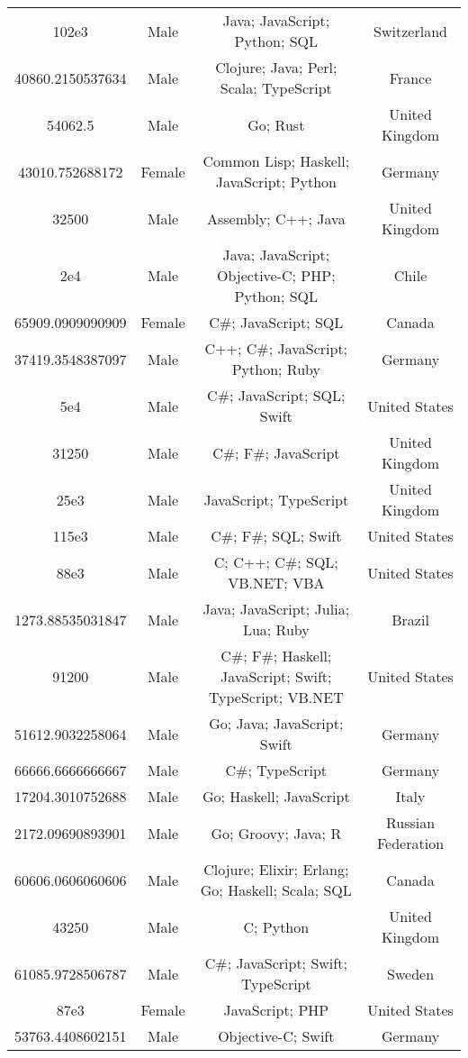 \begin{center}
\begin{tabular}{ |c|c|c|c| }
102e3  &  Male  &  Java; JavaScript; Python; SQL  &  Switzerland  \\ 
40860.2150537634  &  Male  &  Clojure; Java; Perl; Scala; TypeScript  &  France  \\ 
54062.5  &  Male  &  Go; Rust  &  United Kingdom  \\ 
43010.752688172  &  Female  &  Common Lisp; Haskell; JavaScript; Python  &  Germany  \\ 
32500  &  Male  &  Assembly; C++; Java  &  United Kingdom  \\ 
2e4  &  Male  &  Java; JavaScript; Objective-C; PHP; Python; SQL  &  Chile  \\ 
65909.0909090909  &  Female  &  C\#; JavaScript; SQL  &  Canada  \\ 
37419.3548387097  &  Male  &  C++; C\#; JavaScript; Python; Ruby  &  Germany  \\ 
5e4  &  Male  &  C\#; JavaScript; SQL; Swift  &  United States  \\ 
31250  &  Male  &  C\#; F\#; JavaScript  &  United Kingdom  \\ 
25e3  &  Male  &  JavaScript; TypeScript  &  United Kingdom  \\ 
115e3  &  Male  &  C\#; F\#; SQL; Swift  &  United States  \\ 
88e3  &  Male  &  C; C++; C\#; SQL; VB.NET; VBA  &  United States  \\ 
1273.88535031847  &  Male  &  Java; JavaScript; Julia; Lua; Ruby  &  Brazil  \\ 
91200  &  Male  &  C\#; F\#; Haskell; JavaScript; Swift; TypeScript; VB.NET  &  United States  \\ 
51612.9032258064  &  Male  &  Go; Java; JavaScript; Swift  &  Germany  \\ 
66666.6666666667  &  Male  &  C\#; TypeScript  &  Germany  \\ 
17204.3010752688  &  Male  &  Go; Haskell; JavaScript  &  Italy  \\ 
2172.09690893901  &  Male  &  Go; Groovy; Java; R  &  Russian Federation  \\ 
60606.0606060606  &  Male  &  Clojure; Elixir; Erlang; Go; Haskell; Scala; SQL  &  Canada  \\ 
43250  &  Male  &  C; Python  &  United Kingdom  \\ 
61085.9728506787  &  Male  &  C\#; JavaScript; Swift; TypeScript  &  Sweden  \\ 
87e3  &  Female  &  JavaScript; PHP  &  United States  \\ 
53763.4408602151  &  Male  &  Objective-C; Swift  &  Germany  \\ 

\end{tabular}
\end{center}

